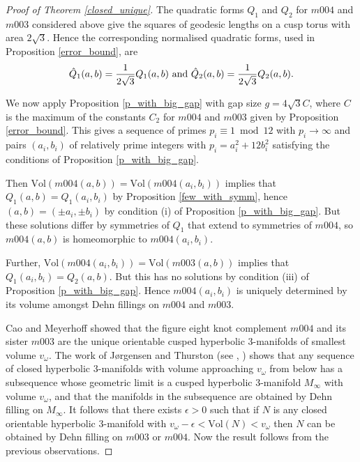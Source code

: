 \documentclass[reqno]{amsproc}  %
\def\vol{\text{Vol} }
\begin{document}
\begin{proof}[Proof of Theorem \ref{closed_unique}]

The quadratic forms $Q_1$ and $Q_2$ for $m004$ and $m003$ considered  above
give the squares of geodesic lengths on a cusp torus with area $2 \sqrt{3}$. Hence
the corresponding normalised quadratic forms, used in Proposition \ref{error_bound}, are
$$\hat Q_1(a,b) =  {1 \over 2 \sqrt{3}} Q_1(a,b) \text{ and } \hat Q_2(a,b) =  {1 \over 2 \sqrt{3}} Q_2 (a,b).$$

We now apply Proposition \ref{p_with_big_gap} with gap size $g = 4 \sqrt{3} C$, where $C$ is the maximum of the 
constants $C_2$ for $m004$ and $m003$ given by Proposition \ref{error_bound}.  This gives 
a sequence of primes $p_i \equiv1 \bmod 12$ with $p_i \to \infty$ and pairs $(a_i,b_i)$ of relatively prime integers 
with $p_i =a_i^2+12b_i^2$ satisfying the conditions of Proposition \ref{p_with_big_gap}.

\smallskip
Then $\vol (m004(a,b)) = \vol (m004(a_i,b_i))$ implies that
 $Q_1(a,b)=Q_1(a_i,b_i)$ by Proposition \ref{few_with_symm},
 hence $(a,b) = (\pm a_i, \pm b_i)$ by condition (i) of Proposition \ref{p_with_big_gap}. 
 But these solutions differ by symmetries of $Q_1$
 that extend to symmetries of $m004$, so
 $m004(a,b)$ is homeomorphic to $m004(a_i,b_i)$.

\smallskip
Further, $\vol (m004(a_i,b_i)) = \vol (m003(a,b))$ implies that
$Q_1(a_i,b_i)=Q_2(a,b)$. But this has no solutions by condition (iii) of
Proposition \ref{p_with_big_gap}.
Hence $m004(a_i,b_i)$ is uniquely
determined by its volume amongst Dehn fillings on $m004$ and $m003$.

\smallskip
Cao and Meyerhoff \cite{CM} showed that the figure eight knot complement $m004$ and its sister $m003$
are the unique orientable cusped hyperbolic 3-manifolds of smallest volume $v_\omega$.
 The work of J{\o}rgensen and Thurston (see \cite{Th}, \cite{Gr}) shows that 
any sequence of closed hyperbolic 3-manifolds with volume approaching $v_\omega$ from below has a 
subsequence whose geometric limit is a cusped hyperbolic 3-manifold $M_\infty$ with volume $v_\omega$, 
and that the manifolds in the subsequence are obtained by Dehn filling on $M_\infty$.
It follows that there exists $\epsilon >0$ such that if $N$ is any closed orientable hyperbolic 3-manifold with 
$v_\omega - \epsilon < \vol(N) <v_\omega$ then $N$ can be obtained by Dehn filling on $m003$ or $m004$.
Now the result follows from the previous observations.
\end{proof}
\end{document}
